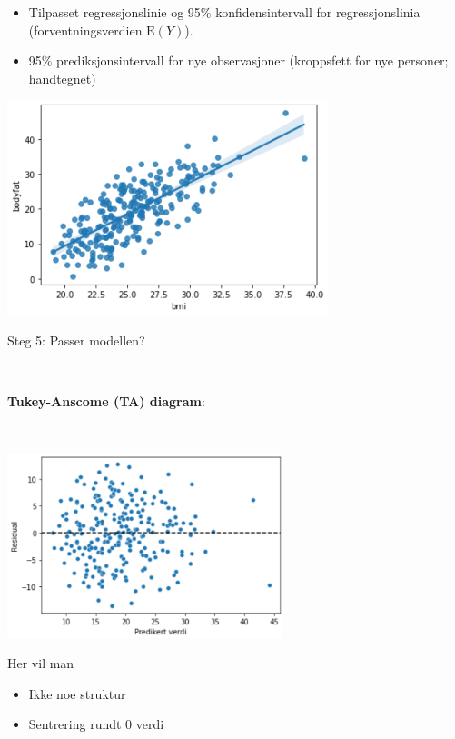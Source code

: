 \documentclass[10pt,ignorenonframetext,]{beamer}
\providecommand{\tightlist}{%
  \setlength{\itemsep}{0pt}\setlength{\parskip}{0pt}}
\begin{document}
\begin{frame}

\begin{itemize}
\item
  Tilpasset regressjonslinie og 95\% konfidensintervall for
  regressjonslinia (forventningsverdien \(\text{E}(Y)\)).
\item
  95\% prediksjonsintervall for nye observasjoner (kroppsfett for nye
  personer; handtegnet)
\end{itemize}

\includegraphics[width=0.7\textwidth,height=\textheight]{ols_result_plot.png}

\end{frame}

\begin{frame}

\begin{block}{Steg 5: Passer modellen?}

\(~\)

\textbf{Tukey-Anscome (TA) diagram}:

\(~\)

\centering

\includegraphics[width=0.6\textwidth,height=\textheight]{tukeyAnscombe1.png}

\flushleft

Her vil man

\begin{itemize}
\tightlist
\item
  Ikke noe struktur
\item
  Sentrering rundt 0 verdi
\end{itemize}

\end{block}

\end{frame}
\end{document}
